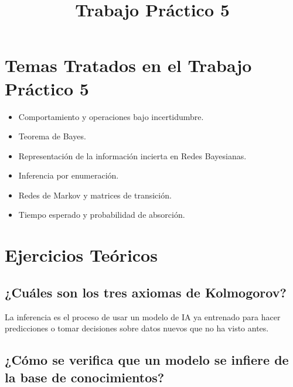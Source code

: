 \documentclass[11pt]{article}
\title{Trabajo Práctico 5}
\begin{document}
    
    \maketitle
    
    

    
    \hypertarget{temas-tratados-en-el-trabajo-pruxe1ctico-4}{%
\section{Temas Tratados en el Trabajo Práctico
5}\label{temas-tratados-en-el-trabajo-pruxe1ctico-5}}

\begin{itemize}
\item Comportamiento y operaciones bajo incertidumbre.

\item Teorema de Bayes.

\item Representación de la información incierta en Redes Bayesianas.

\item Inferencia por enumeración.

\item Redes de Markov y matrices de transición.

\item Tiempo esperado y probabilidad de absorción.
\end{itemize}

    \hypertarget{ejercicios-teuxf3ricos}{%
\section{Ejercicios Teóricos}\label{ejercicios-teuxf3ricos}}

\hypertarget{quuxe9-es-una-inferencia}{%
\subsection{¿Cuáles son los tres axiomas de Kolmogorov?}\label{quuxe9-es-una-inferencia}}

    La inferencia es el proceso de usar un modelo de IA ya entrenado para
hacer predicciones o tomar decisiones sobre datos nuevos que no ha visto
antes.

    \hypertarget{cuxf3mo-se-verifica-que-un-modelo-se-infiere-de-la-base-de-conocimientos}{%
\subsection{¿Cómo se verifica que un modelo se infiere de la base de
conocimientos?}\label{cuxf3mo-se-verifica-que-un-modelo-se-infiere-de-la-base-de-conocimientos}}
\end{document}
